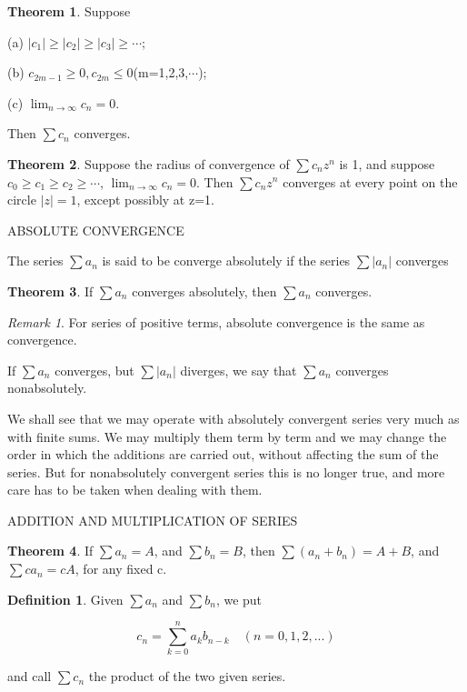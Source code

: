 \documentclass{article}
\theoremstyle{definition}
\newtheorem{defi}{Definition}
\newtheorem{theo}{Theorem}
\theoremstyle{remark}
\newtheorem{Rem}{Remark}
\begin{document}
\begin{theo}
	Suppose
	
	(a) $|c_1|\ge |c_2|\ge |c_3|\ge\cdots$;
	
	(b) $c_{2m-1}\ge0, c_{2m}\le0$\quad (m=1,2,3,$\cdots$);
	
	(c) $\lim_{n\rightarrow\infty} c_n=0 $.
	
	Then $\sum c_n$ converges.
\end{theo}

\begin{theo}
	Suppose the radius of convergence of $\sum c_n z^n$ is 1, and suppose $c_0\ge c_1\ge c_2\ge\cdots$, $\lim_{n\rightarrow\infty}c_n=0$. Then $\sum c_n z^n$ converges at every point on the circle $|z|=1$, except possibly at z=1.
\end{theo}

\newpage

ABSOLUTE CONVERGENCE

The series $\sum a_n$ is said to be converge absolutely if the series $\sum|a_n|$ converges

\begin{theo}
	 If $\sum a_n$ converges absolutely, then $\sum a_n$ converges.
\end{theo}

\begin{Rem}
	For series of positive terms, absolute convergence is the same as convergence.
\end{Rem}

If $\sum a_n$ converges, but $\sum|a_n|$ diverges, we say that $\sum a_n$ converges nonabsolutely.

We shall see that we may operate with absolutely convergent series very much as with finite sums. We may multiply them term by term and we may change the order in which the additions are carried out, without affecting the sum of the series. But for nonabsolutely convergent series this is no longer true, and more care has to be taken when dealing with them.

\newpage
ADDITION AND MULTIPLICATION OF SERIES

\begin{theo}
If	$\sum a_n=A$, and $\sum b_n=B$, then $\sum (a_n+b_n)=A+B$, and $\sum ca_n=cA$, for any fixed c.
\end{theo}

\begin{defi}
Given $\sum a_n$ and $\sum b_n$, we put

\[
c_n=\sum^n_{k=0} a_k b_{n-k}\quad (n=0,1,2,...)
\]

and call $\sum c_n$ the product of the two given series.

\end{defi}
\end{document}
